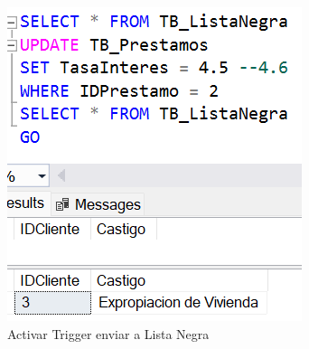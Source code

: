 \begin{figure}[H]
  \centering
  \includegraphics[scale = 0.5]{Imagenes/SQL/5.Ejercicios/activar_trigger_listanegra.png}
  \caption{Activar Trigger enviar a Lista Negra}
\end{figure}

